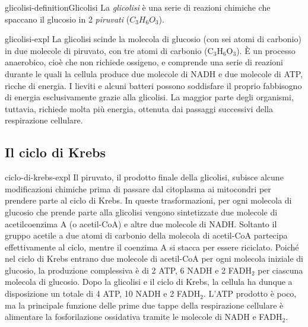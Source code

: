 \documentclass[preview]{standalone}
\begin{document}
\begin{snippetdefinition}{glicolisi-definition}{Glicolisi}
    La \textit{glicolisi} è una serie di reazioni chimiche che spaccano il glucosio in 2 \textit{piruvati} (\(C_3H_6O_3\)).
\end{snippetdefinition}

\begin{snippet}{glicolisi-expl}
    La glicolisi scinde la molecola di glucosio (con sei atomi di carbonio) in due molecole di
    piruvato, con tre atomi di carbonio (C\({}_3\)H\({}_6\)O\({}_3\)). È un processo anaerobico, cioè che non
    richiede ossigeno, e comprende una serie di reazioni durante le quali la cellula produce due
    molecole di NADH e due molecole di ATP, ricche di energia. I lieviti e alcuni batteri possono
    soddisfare il proprio fabbisogno di energia esclusivamente grazie alla glicolisi. La maggior
    parte degli organismi, tuttavia, richiede molta più energia, ottenuta dai passaggi successivi
    della respirazione cellulare.
\end{snippet}

\subsection{Il ciclo di Krebs}

\begin{snippet}{ciclo-di-krebs-expl}
    Il piruvato, il prodotto finale della glicolisi, subisce alcune modificazioni chimiche prima di
    passare dal citoplasma ai mitocondri per prendere parte al ciclo di Krebs. In queste
    trasformazioni, per ogni molecola di glucosio che prende parte alla glicolisi vengono
    sintetizzate due molecole di acetilcoenzima A (o acetil-CoA) e altre due molecole di NADH.
    Soltanto il gruppo acetile a due atomi di carbonio della molecola di acetil-CoA partecipa
    effettivamente al ciclo, mentre il coenzima A si stacca per essere riciclato. Poiché nel ciclo
    di Krebs entrano due molecole di acetil-CoA per ogni molecola iniziale di glucosio, la
    produzione complessiva è di 2 ATP, 6 NADH e 2 FADH\({}_2\) per ciascuna molecola di glucosio.
    Dopo la glicolisi e il ciclo di Krebs, la cellula ha dunque a disposizione un totale di 4 ATP, 10
    NADH e 2 FADH\({}_2\). L'ATP prodotto è poco, ma la principale funzione delle prime due tappe
    della respirazione cellulare è alimentare la fosforilazione ossidativa tramite le molecole di
    NADH e FADH\({}_2\).
\end{snippet}
\end{document}
